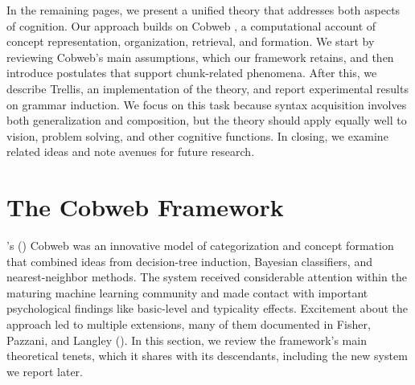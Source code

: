 \documentclass[11pt,letterpaper]{article}
\def\trellis/{{\sc Trellis}}
\begin{document}
In the remaining pages, we present a unified theory
that addresses both aspects of cognition. Our approach builds on Cobweb
\citep{fisher-cobweb}, a computational account of concept representation,
organization, retrieval, and formation. We start by reviewing Cobweb's
main assumptions, which our framework retains, and then introduce
postulates that support chunk-related phenomena. After this, we
describe \trellis/, an implementation of the theory, and report
experimental results on grammar induction. We focus on this task  
because syntax acquisition involves both generalization and composition, 
but the theory should apply equally well to vision, problem solving, 
and other cognitive functions. In closing, we examine related ideas
and note avenues for future research.




\section{The Cobweb Framework}

\citeauthor{fisher-cobweb}'s (\citeyear{fisher-cobweb}) Cobweb was an innovative model of categorization and
concept formation that combined ideas from decision-tree induction,
Bayesian classifiers, and nearest-neighbor methods. The system
received considerable attention within the maturing machine learning
community and made contact with important psychological findings
like basic-level and typicality effects. Excitement about the approach
led to multiple extensions, many of them documented in Fisher, Pazzani, 
and Langley (\citeyear{fisher-concept-formation-vol}). In this 
section, we review the framework's main theoretical tenets, which 
it shares with its descendants, including the new system we report 
later. 
\end{document}
